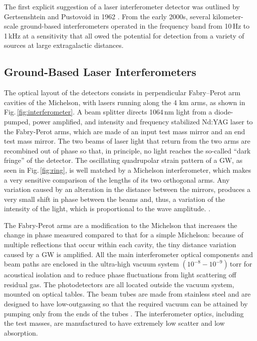 \documentclass[binding=0.6cm, LaM]{sapthesis}
\begin{document}
	The first explicit suggestion of a laser interferometer detector 
	was outlined by Gertsenshtein and Pustovoid in 1962 \cite{8}.
	From the early 2000s, several kilometer-scale ground-based interferometers 
	operated in the frequency band from 10\,Hz to 1\,kHz at a sensitivity 
	that all owed the potential for detection from a variety 
	of sources at large extragalactic distances.

\subsection{Ground-Based Laser Interferometers}
	The optical layout of the detectors consists in perpendicular 
	Fabry–Perot arm cavities of the Michelson, 
	with lasers running along the 4 km arms, as shown in Fig.\,\ref{fig:interferometer}. 
	A beam splitter directs 1064\,nm light from a diode-pumped, power amplified, 
	and intensity and frequency stabilized Nd:YAG laser to the Fabry-Perot arms, 
	which are made of an input test mass mirror and an end test mass mirror. 
	The two beams of laser light that return from the two arms are recombined out of phase so that, 
	in principle, no light reaches the so-called ``dark fringe'' of the detector. 
	The oscillating quadrupolar strain pattern of a GW, 
	as seen in Fig.\,\ref{fig:ring}, is well matched by a Michelson interferometer,
        which makes a very sensitive comparison of the lengths of its two orthogonal arms.
	Any variation caused by an alteration in the distance between the mirrors, 
	produces a very small shift in phase between the beams and, thus, 
	a variation of the intensity of the light, which is proportional to the wave amplitude. \cite{10}.

	The Fabry-Perot arms are a modification to the Michelson 
	that increases the change in phase measured compared to that for a simple Michelson: 
	because of multiple reflections that occur within each cavity, 
	the tiny distance variation caused by a GW is amplified. 
	All the main interferometer optical components and beam paths are enclosed in the ultra-high vacuum system
        $(10^{−8} - 10^{−9})\,$torr for acoustical isolation and to reduce phase fluctuations from light scattering off residual gas.
        The photodetectors are all located outside the vacuum system, mounted on optical tables.
        The beam tubes are made from stainless steel and are designed to have low-outgassing
        so that the required vacuum can be attained by pumping only from the ends of the tubes \cite{11}. 
        The interferometer optics, including the test masses, are manufactured to have extremely low scatter and low absorption.
\end{document}
